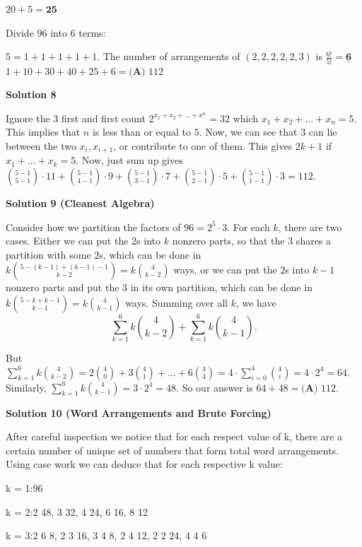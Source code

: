 \begin{enumerate}
$20 + 5 = \underline{\textbf{25}}$

 
Divide $96$ into $6$ terms:

 $5 = 1 + 1 + 1 + 1 + 1$. The number of arrangements of $(2, 2, 2, 2, 2, 3)$ is $\frac{6!}{5!} = \underline{\textbf{6}}$
$1 + 10 + 30 + 40 + 25 + 6 = \boxed{\textbf{(A) }112}$




\textbf{Solution 8}

Ignore the $3$ first and first count $2^{x_1+x_2+...+x^n}=32$ which $x_1+x_2+...+x_n=5$. This implies that $n$ is less than or equal to $5$. Now, we can see that $3$ can lie between the two $x_i, x_{i+1}$, or contribute to one of them. This gives $2k+1$ if $x_1+...+x_k=5$. Now, just sum up gives $\binom{5-1}{5-1}\cdot 11+\binom{5-1}{4-1}\cdot 9+\binom{5-1}{3-1}\cdot 7+\binom{5-1}{2-1}\cdot 5+\binom{5-1}{1-1}\cdot 3=\boxed{112}$.

 



\textbf{Solution 9 (Cleanest Algebra)}

Consider how we partition the factors of $96 = 2^5\cdot 3$. For each $k$, there are two cases. Either we can put the $2$s into $k$ nonzero parts, so that the $3$ shares a partition with some $2$s, which can be done in $k\binom{5-(k-1)+(k-1)-1}{k-2} = k\binom{4}{k-2}$ ways, or we can put the $2$s into $k-1$ nonzero parts and put the $3$ in its own partition, which can be done in $k\binom{5-k+k-1}{k-1} = k\binom{4}{k-1}$ ways. Summing over all $k$, we have 
 \[\sum_{k=1}^6 k\binom{4}{k-2} + \sum_{k=1}^6 k\binom{4}{k-1}.\] 

 But $\sum_{k=1}^6 k\binom{4}{k-2} = 2\binom{4}{0}+3\binom{4}{1} + \dots + 6\binom{4}{4} = 4 \cdot \sum_{i=0}^4 \binom{4}{i} = 4 \cdot 2^4 = 64$. Similarly, $\sum_{k=1}^6 k\binom{4}{k-1} = 3\cdot 2^4 = 48$. So our answer is $64+48 = \boxed{\textbf{(A) }112}$.

 



\textbf{Solution 10 (Word Arrangements and Brute Forcing)}

After careful inspection we notice that for each respect value of k, there are a certain number of unique set of numbers that form total word arrangements. Using case work we can deduce that for each respective k value:

 k = 1:96

 k = 2:2 48, 3 32, 4 24, 6 16, 8 12

 k = 3:2 6 8, 2 3 16, 3 4 8, 2 4 12, 2 2 24, 4 4 6


\end{enumerate}

